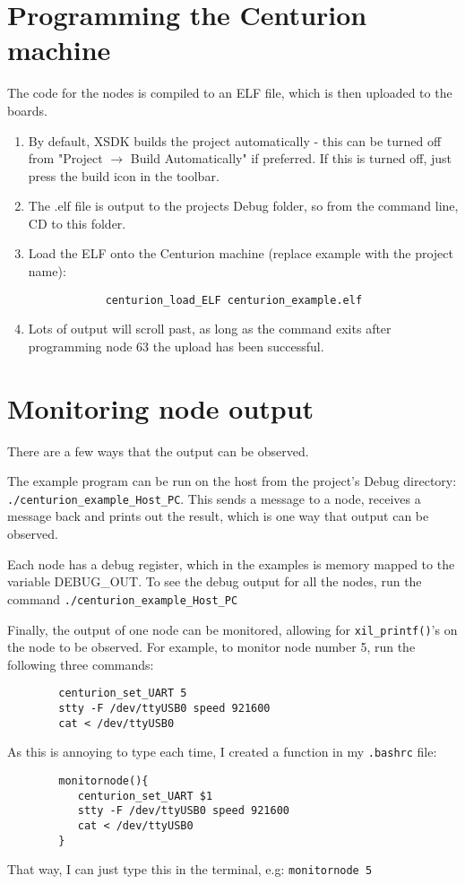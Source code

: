 \documentclass{article}
\begin{document}
	\section{Programming the Centurion machine}
	The code for the nodes is compiled to an ELF file, which is then uploaded to the boards.
	\begin{enumerate}
		\item By default, XSDK builds the project automatically - this can be turned off from "Project $\rightarrow$ Build Automatically" if preferred. If this is turned off, just press the build icon in the toolbar.
		\item The .elf file is output to the projects Debug folder, so from the command line, CD to this folder.
		\item Load the ELF onto the Centurion machine (replace example with the project name):
			\begin{verbatim}
			centurion_load_ELF centurion_example.elf
			\end{verbatim}
		\item Lots of output will scroll past, as long as the command exits after programming node 63 the upload has been successful.
	\end{enumerate}

	\section{Monitoring node output}
	There are a few ways that the output can be observed.
	
	The example program can be run on the host from the project's Debug directory: \verb|./centurion_example_Host_PC|. This sends a message to a node, receives a message back and prints out the result, which is one way that output can be observed.
	
	Each node has a debug register, which in the examples is memory mapped to the variable DEBUG\_OUT. To see the debug output for all the nodes, run the command \verb|./centurion_example_Host_PC|
	
	Finally, the output of one node can be monitored, allowing for \verb|xil_printf()|'s on the node to be observed.
	For example, to monitor node number 5, run the following three commands:
		\begin{verbatim}
		centurion_set_UART 5
		stty -F /dev/ttyUSB0 speed 921600
		cat < /dev/ttyUSB0
		\end{verbatim}
	
	As this is annoying to type each time, I created a function in my \verb|.bashrc| file:
		\begin{verbatim}
		monitornode(){
		   centurion_set_UART $1
		   stty -F /dev/ttyUSB0 speed 921600
		   cat < /dev/ttyUSB0
		}
		\end{verbatim}
	That way, I can just type this in the terminal, e.g: \verb|monitornode 5|
	
\end{document}
